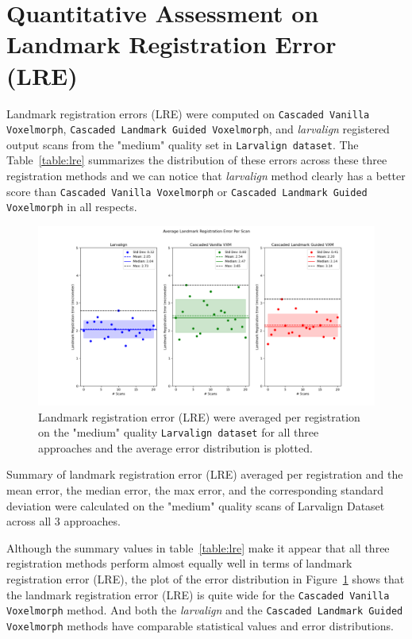 \documentclass{book}
\begin{document}
	\section{Quantitative Assessment on Landmark Registration Error (LRE)}
	Landmark registration errors (LRE) were computed on \texttt{Cascaded Vanilla Voxelmorph}, \texttt{Cascaded Landmark Guided Voxelmorph}, and \textit{larvalign} registered output scans from the "medium" quality set in \texttt{Larvalign dataset}. The Table~\ref{table:lre} summarizes the distribution of these errors across these three registration methods and we can notice that \textit{larvalign} method clearly has a better score than \texttt{Cascaded Vanilla Voxelmorph} or \texttt{Cascaded Landmark Guided Voxelmorph} in all respects. 
	
	\begin{figure}[h!]
		\centering
		\includegraphics[width=0.9\columnwidth]{resources/chapter5_fresh/stats_per_scan_output/Stats_Per_Landmark.png}
		\caption{Landmark registration error (LRE) were averaged per registration on the "medium" quality \texttt{Larvalign dataset} for all three approaches and the average error distribution is plotted.}
		\label{fig:mean_stats_per_scan}
	\end{figure}

	\begin{table}[h!]
		\centering
		
		\caption{Summary of landmark registration error (LRE) averaged per registration and the mean error, the median error, the max error, and the corresponding standard deviation were calculated on the "medium" quality scans of Larvalign Dataset across all 3 approaches.}
		\label{table:lre}
	\end{table}
	
	Although the summary values in table~\ref{table:lre} make it appear that all three registration methods perform almost equally well in terms of landmark registration error (LRE), the plot of the error distribution in Figure~\ref{fig:mean_stats_per_scan} shows that the landmark registration error (LRE) is quite wide for the \texttt{Cascaded Vanilla Voxelmorph} method. And both the \textit{larvalign} and the \texttt{Cascaded Landmark Guided Voxelmorph} methods have comparable statistical values and error distributions.
	
\end{document}
